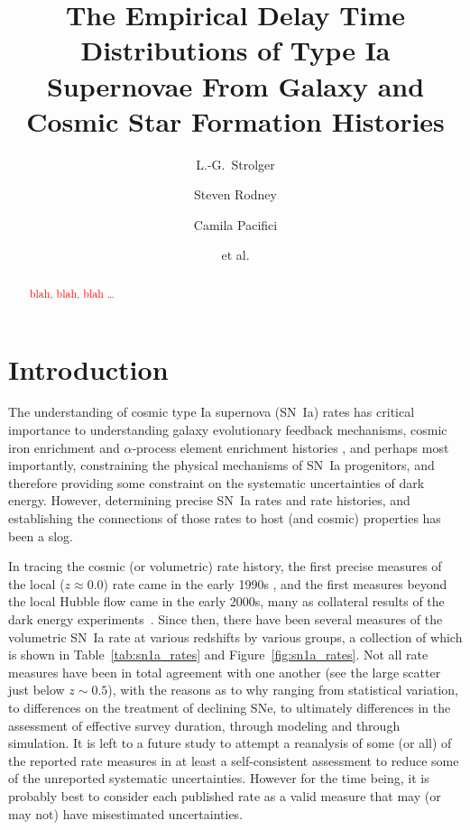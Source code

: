 \documentclass[apj]{aastex62}
\begin{document}
\title{The Empirical Delay Time Distributions of Type Ia Supernovae From Galaxy and Cosmic Star Formation Histories}
\author[0000-0002-7756-4440]{L.-G.~Strolger}
\author{Steven Rodney}
\author{Camila Pacifici}
\author{et al.}

\begin{abstract}
\textcolor{red}{blah, blah, blah \ldots}
\end{abstract}

\section{Introduction}
The understanding of cosmic type Ia supernova (SN~Ia) rates has critical importance to understanding galaxy evolutionary feedback mechanisms, cosmic iron enrichment and $\alpha$-process element enrichment histories \citep[see][]{Maoz:2017ck}, and perhaps most importantly, constraining the physical mechanisms of SN~Ia progenitors, and therefore providing some constraint on the systematic uncertainties of dark energy. However, determining precise SN~Ia rates and rate histories, and establishing the connections of those rates to host (and cosmic) properties has been a slog. 

In tracing the cosmic (or volumetric) rate history, the first precise measures of the local ($z\approx0.0$) rate came in the early 1990s \cite[cf.][]{Cappellaro:1993qm,Cappellaro:1999}, and the first measures beyond the local Hubble flow came in the early 2000s, many as collateral results of the dark energy experiments~\citep{Riess:1998,Perlmutter:1999}. Since then, there have been several measures of the volumetric SN~Ia rate at various redshifts by various groups, a collection of which is shown in Table~\ref{tab:sn1a_rates} and Figure~\ref{fig:sn1a_rates}. Not all rate measures have been in total agreement with one another (see the large scatter just below $z\sim0.5$), with the reasons as to why ranging from statistical variation, to differences on the treatment of declining SNe, to ultimately differences in the assessment of effective survey duration, through modeling and through simulation. It is left to a future study to attempt a reanalysis of some (or all) of the reported rate measures in at least a self-consistent assessment to reduce some of the unreported systematic uncertainties. However for the time being, it is probably best to consider each published rate as a valid measure that may (or may not) have misestimated uncertainties. 
\end{document}
